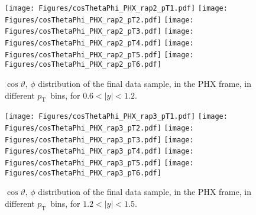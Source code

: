 \documentclass[12pt]{article}
\newcommand{\pt}{$p_{\mathrm{T}}$}
\begin{document}
\begin{figure}[htbp]
\centering
\texttt{[image: Figures/cosThetaPhi\_PHX\_rap2\_pT1.pdf]}
\texttt{[image: Figures/cosThetaPhi\_PHX\_rap2\_pT2.pdf]}
\texttt{[image: Figures/cosThetaPhi\_PHX\_rap2\_pT3.pdf]}
\texttt{[image: Figures/cosThetaPhi\_PHX\_rap2\_pT4.pdf]}
\texttt{[image: Figures/cosThetaPhi\_PHX\_rap2\_pT5.pdf]}
\texttt{[image: Figures/cosThetaPhi\_PHX\_rap2\_pT6.pdf]}
\caption{$\cos\vartheta,\,\phi$ distribution of the final data sample, 
	in the PHX frame, in different \pt\ bins, for $0.6 < |y| < 1.2$.}
\end{figure}
\clearpage

\begin{figure}[htbp]
\centering
\texttt{[image: Figures/cosThetaPhi\_PHX\_rap3\_pT1.pdf]}
\texttt{[image: Figures/cosThetaPhi\_PHX\_rap3\_pT2.pdf]}
\texttt{[image: Figures/cosThetaPhi\_PHX\_rap3\_pT3.pdf]}
\texttt{[image: Figures/cosThetaPhi\_PHX\_rap3\_pT4.pdf]}
\texttt{[image: Figures/cosThetaPhi\_PHX\_rap3\_pT5.pdf]}
\texttt{[image: Figures/cosThetaPhi\_PHX\_rap3\_pT6.pdf]}
\caption{$\cos\vartheta,\,\phi$ distribution of the final data sample, 
	in the PHX frame, in different \pt\ bins, for $1.2 < |y| < 1.5$.}
\end{figure}
\clearpage
\end{document}
